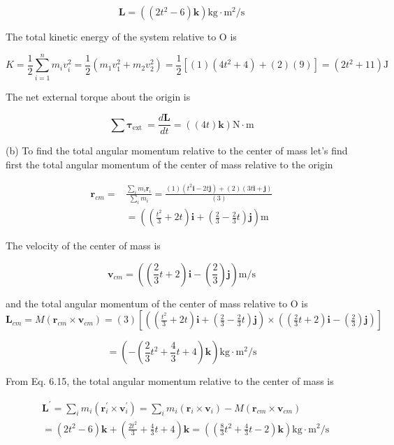 \documentclass[10pt]{article}
\begin{document}
$$
\mathbf{L}=\left(\left(2 t^{2}-6\right) \mathbf{k}\right) \mathrm{kg} \cdot \mathrm{m}^{2} / \mathrm{s}
$$

The total kinetic energy of the system relative to O is

$$
K=\frac{1}{2} \sum_{i=1}^{n} m_{i} v_{i}^{2}=\frac{1}{2}\left(m_{1} v_{1}^{2}+m_{2} v_{2}^{2}\right)=\frac{1}{2}\left[(1)\left(4 t^{2}+4\right)+(2)(9)\right]=\left(2 t^{2}+11\right) \mathrm{J}
$$

The net external torque about the origin is

$$
\sum \boldsymbol{\tau}_{\text {ext }}=\frac{d \mathbf{L}}{d t}=((4 t) \mathbf{k}) \mathrm{N} \cdot \mathrm{m}
$$

(b) To find the total angular momentum relative to the center of mass let's find first the total angular momentum of the center of mass relative to the origin

$$
\begin{aligned}
\mathbf{r}_{c m}= & \frac{\sum_{i} m_{i} \mathbf{r}_{i}}{\sum_{i} m_{i}}=\frac{(1)\left(t^{2} \mathbf{i}-2 t \mathbf{j}\right)+(2)(3 t \mathbf{i}+\mathbf{j})}{(3)} \\
& =\left(\left(\frac{t^{2}}{3}+2 t\right) \mathbf{i}+\left(\frac{2}{3}-\frac{2}{3} t\right) \mathbf{j}\right) \mathrm{m}
\end{aligned}
$$

The velocity of the center of mass is

$$
\mathbf{v}_{c m}=\left(\left(\frac{2}{3} t+2\right) \mathbf{i}-\left(\frac{2}{3}\right) \mathbf{j}\right) \mathrm{m} / \mathrm{s}
$$

and the total angular momentum of the center of mass relative to O is\\
$\mathbf{L}_{c m}=M\left(\mathbf{r}_{c m} \times \mathbf{v}_{c m}\right)=(3)\left[\left(\left(\frac{t^{2}}{3}+2 t\right) \mathbf{i}+\left(\frac{2}{3}-\frac{2}{3} t\right) \mathbf{j}\right) \times\left(\left(\frac{2}{3} t+2\right) \mathbf{i}-\left(\frac{2}{3}\right) \mathbf{j}\right)\right]$

$$
=\left(-\left(\frac{2}{3} t^{2}+\frac{4}{3} t+4\right) \mathbf{k}\right) \mathrm{kg} \cdot \mathrm{m}^{2} / \mathrm{s}
$$

From Eq. 6.15, the total angular momentum relative to the center of mass is

$$
\begin{aligned}
& \mathbf{L}^{\prime}=\sum_{i} m_{i}\left(\mathbf{r}_{i}^{\prime} \times \mathbf{v}_{i}^{\prime}\right)=\sum_{i} m_{i}\left(\mathbf{r}_{i} \times \mathbf{v}_{i}\right)-M\left(\mathbf{r}_{c m} \times \mathbf{v}_{c m}\right) \\
& =\left(2 t^{2}-6\right) \mathbf{k}+\left(\frac{2 t^{2}}{3}+\frac{4}{3} t+4\right) \mathbf{k}=\left(\left(\frac{8}{3} t^{2}+\frac{4}{3} t-2\right) \mathbf{k}\right) \mathrm{kg} \cdot \mathrm{m}^{2} / \mathrm{s}
\end{aligned}
$$
\end{document}
